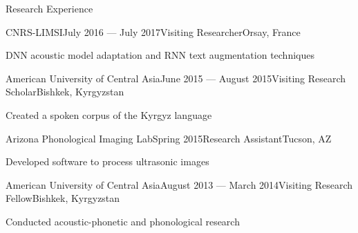 \documentclass{resume} %
\begin{document}
\newpage




\vspace{.25cm}

\begin{rSection}{Research Experience}

\begin{rSubsection}{CNRS-LIMSI}{July 2016 --- July 2017}{Visiting Researcher}{Orsay, France}
\item DNN acoustic model adaptation and RNN text augmentation techniques
\end{rSubsection}

\begin{rSubsection}{American University of Central Asia}{June 2015 --- August 2015}{Visiting Research Scholar}{Bishkek, Kyrgyzstan}
\item Created a spoken corpus of the Kyrgyz language
\end{rSubsection}

\begin{rSubsection}{Arizona Phonological Imaging Lab}{Spring 2015}{Research Assistant}{Tucson, AZ}
\item Developed software to process ultrasonic images
\end{rSubsection}

\begin{rSubsection}{American University of Central Asia}{August 2013 --- March 2014}{Visiting Research Fellow}{Bishkek, Kyrgyzstan}
\item Conducted acoustic-phonetic and phonological research
\end{rSubsection}



\end{rSection}
\end{document}
